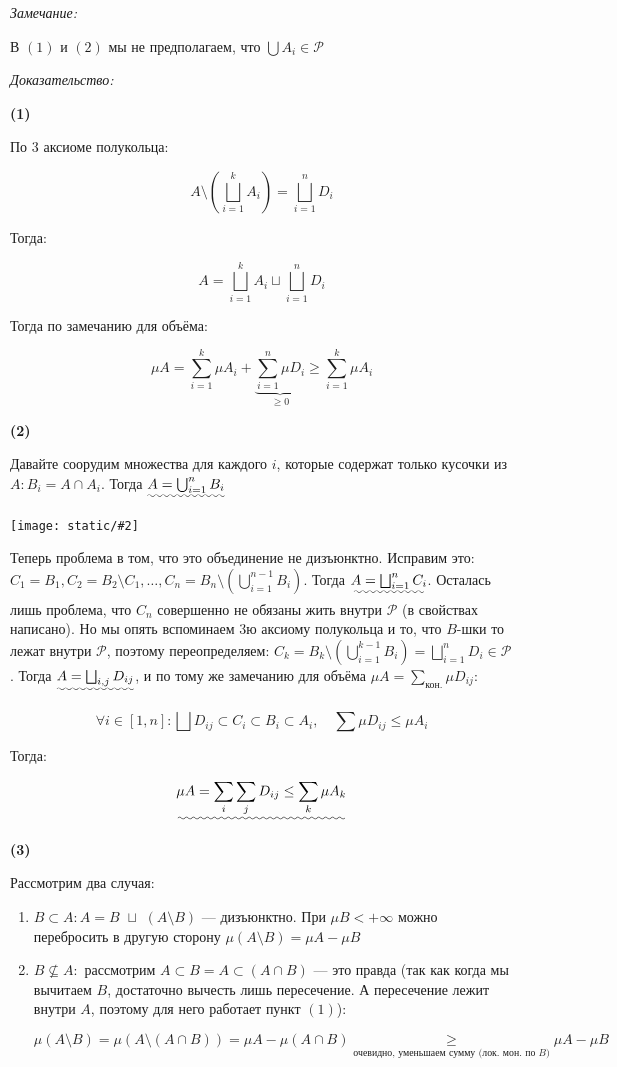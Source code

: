 \documentclass{article}
\def\dbl{\,\,}
\def\images#1#2{\begin{center}\texttt{[image: static/\#2]}\end{center}}
\begin{document}
\textit{Замечание:}

В $(1)$ и $(2)$ мы не предполагаем, что $\bigcup A_i \in \mathcal{P}$

\textit{Доказательство:}

\textbf{(1)}

По 3 аксиоме полукольца: 

\[A \setminus \left(\bigsqcup_{i = 1}^{k} A_{i}\right) = \bigsqcup_{i = 1}^{n} D_{i}\]

Тогда: 

\[A = \bigsqcup_{i = 1}^{k} A_i \sqcup \bigsqcup_{i = 1}^{n} D_i\]

Тогда по замечанию для объёма: 

\[\mu A = \sum_{i = 1}^{k} \mu A_i + \underbrace{\sum_{i = 1}^{n} \mu D_i}_{\ge 0} \ge \sum_{i = 1}^{k} \mu A_i\]

\textbf{(2)}

Давайте соорудим множества для каждого $i$, которые содержат только кусочки из $A: B_i = A \cap A_i$. Тогда $\uwave{A = \bigcup_{i = 1}^{n} B_i}$

\images{0.3}{sv_ob.png}

Теперь проблема в том, что это объединение не дизъюнктно. Исправим это: $C_1 = B_1, C_2 = B_2 \setminus C_1, \ldots, C_n = B_n \setminus (\bigcup_{i = 1}^{n - 1} B_{i})$. Тогда $\uwave{A = \bigsqcup_{i = 1}^{n} C_i}$. Осталась лишь проблема, что $C_n$ совершенно не обязаны жить внутри $\mathcal{P}$ (в свойствах написано). Но мы опять вспоминаем 3ю аксиому полукольца и то, что $B$-шки то лежат внутри $\mathcal{P}$, поэтому переопределяем: $C_k = B_k \setminus (\bigcup_{i = 1}^{k - 1} B_{i}) = \bigsqcup_{i = 1}^{n} D_i \in \mathcal{P}$. Тогда $\uwave{A = \bigsqcup_{i, j} D_{ij}}$, и по тому же замечанию для объёма $\mu A = \sum_{\text{кон.}}\mu D_{ij}$: 

\[\forall i \in [1, n]: \bigsqcup D_{ij} \subset C_i \subset B_i \subset A_i, \quad \sum \mu D_{ij} \le \mu A_i\]

Тогда: 

\[\uwave{\mu A = \sum_{i} \sum_{j} D_{ij} \le \sum_{k} \mu A_k}\]

\textbf{(3)}

Рассмотрим два случая: 

\begin{enumerate}
    \item $B \subset A: A = B \dbl \sqcup \dbl (A \setminus B)$ --- дизъюнктно. При $\mu B < + \infty $ можно перебросить в другую сторону $\mu (A \setminus B) = \mu A - \mu B$
    \item $B \nsubseteq A:$ рассмотрим $A \subset B = A \subset (A \cap B)$ --- это правда (так как когда мы вычитаем $B$, достаточно вычесть лишь пересечение. А пересечение лежит внутри $A$, поэтому для него работает пункт $(1)$):
    
    \[\mu(A \setminus B) = \mu(A \setminus (A \cap B)) = \mu A - \mu (A \cap B) \underset{\text{очевидно, уменьшаем сумму (лок. мон. по } B)}{\ge} \mu A - \mu B\]
\end{enumerate}
\end{document}
